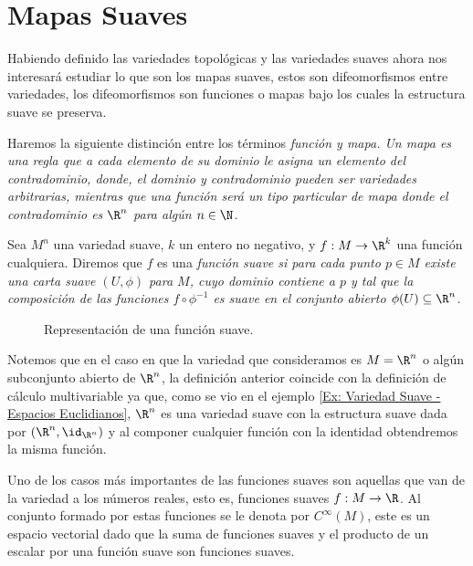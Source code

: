 \section{Mapas Suaves}\label{Sección: Mapas Suaves}
Habiendo definido las variedades topológicas y las variedades suaves ahora nos interesará estudiar lo que son los mapas suaves, estos son difeomorfismos entre variedades, los difeomorfismos son funciones o mapas bajo los cuales la estructura suave se preserva.

Haremos la siguiente distinción entre los términos \it{función} y \it{mapa}. Un mapa es una regla que a cada elemento de su dominio le asigna un elemento del contradominio, donde, el dominio y contradominio pueden ser variedades arbitrarias, mientras que una función será un tipo particular de mapa donde el contradominio es $\R^n$ para algún $n \in \N$.

\begin{definition}\label{Definición: Función Suave}
	Sea $M^n$ una variedad suave, $k$ un entero no negativo, y $f: M \to \R^{k}$ una función cualquiera. Diremos que $f$ es una \it{función suave} si para cada punto $p \in M$ existe una carta suave $(U,\phi)$ para $M$, cuyo dominio contiene a $p$ y tal que la composición de las funciones $f \circ \phi^{-1}$ es suave en el conjunto abierto $\phi(U) \subseteq \R^{n}$.
\end{definition}

\begin{figure}[h]
	\centering
	
	\caption{Representación de una función suave.}
\end{figure}

Notemos que en el caso en que la variedad que consideramos es $M = \R^n$ o algún subconjunto abierto de $\R^n$, la definición anterior coincide con la definición de cálculo multivariable ya que, como se vio en el ejemplo \ref{Ex: Variedad Suave - Espacios Euclidianos}, $\R^n$ es una variedad suave con la estructura suave dada por $(\R^n,\id_{\R^n})$ y al componer cualquier función con la identidad obtendremos la misma función.

Uno de los casos más importantes de las funciones suaves son aquellas que van de la variedad a los números reales, esto es, funciones suaves $f: M \to \R$. Al conjunto formado por estas funciones se le denota por $C^{\infty}(M)$, este es un espacio vectorial dado que la suma de funciones suaves y el producto de un escalar por una función suave son funciones suaves.

